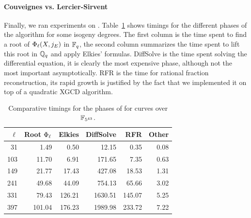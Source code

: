 \paragraph{Couveignes vs. Lercier-Sirvent}
Finally, we ran experiments on
. 
Table~\ref{tab:ls} shows
timings for the different phases of the algorithm for some isogeny
degrees. The first column is the time spent to find a root of
$\Phi_\ell(X,j_E)$ in $\mathbb{F}_q$, the second column summarizes the time
spent to lift this root in $\mathbb{Q}_q$ and apply Elkies'
formulas. DiffSolve is the time spent solving the differential
equation, it is clearly the most expensive phase, although not the
most important asymptotically. RFR is the time for rational fraction
reconstruction, its rapid growth is justified by the fact that we
implemented it on top of a quadratic XGCD algorithm.

\begin{table}[ht]
  \centering
  \begin{tabular}{r r r r r r}
    \hline
    $\ell$ & Root $\Phi_\ell$ & Elkies & DiffSolve & RFR & Other\\
    \hline
    31&1.49&0.50&12.15&0.35&0.08\\
    103&11.70&6.91&171.65&7.35&0.63\\
    149&21.77&17.43&427.08&18.53&1.31\\
    241&49.68&44.09&754.13&65.66&3.02\\
    331&79.43&126.21&1630.51&145.07&5.25\\
    397&101.04&176.23&1989.98&233.72&7.22\\
  \end{tabular}
  \caption{Comparative timings for the phases of  
    for curves over $\mathbb{F}_{5^{43}}$.}
  \label{tab:ls}
\end{table}


